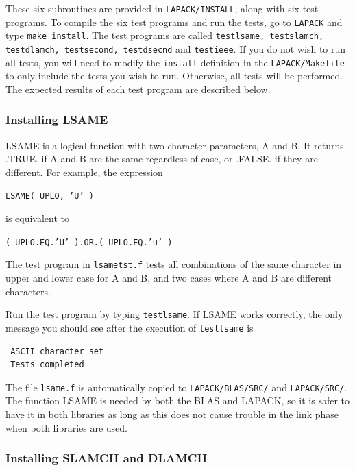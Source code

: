 \documentclass[11pt]{report}
\begin{document}
These six subroutines are provided in \texttt{LAPACK/INSTALL},
along with six test programs.
To compile the six test programs and run the tests, go to \texttt{LAPACK} and
type \texttt{make install}.  The test programs are called
\texttt{testlsame, testslamch, testdlamch, testsecond, testdsecnd} and
\texttt{testieee}.
If you do not wish to run all tests, you will need to modify the 
\texttt{install} definition in the \texttt{LAPACK/Makefile} to only include the
tests you wish to run.  Otherwise, all tests will be performed.
The expected results of each test program are described below.

\subsubsection{Installing LSAME}

LSAME is a logical function with two character parameters, A and B.
It returns .TRUE. if A and B are the same regardless of case, or .FALSE.
if they are different. 
For example, the expression

\begin{list}{}{} 
\item \texttt{LSAME( UPLO, 'U' )}
\end{list}
\noindent 
is equivalent to
\begin{list}{}{} 
\item \texttt{( UPLO.EQ.'U' ).OR.( UPLO.EQ.'u' )}
\end{list} 
 
The test program in \texttt{lsametst.f} tests all combinations of
the same character in upper and lower case for A and B, and two
cases where A and B are different characters.

Run the test program by typing \texttt{testlsame}.
If LSAME works correctly, the only message you should see after the
execution of \texttt{testlsame} is
\begin{verbatim}
 ASCII character set
 Tests completed
\end{verbatim}
The file \texttt{lsame.f} is automatically copied to
\texttt{LAPACK/BLAS/SRC/} and \texttt{LAPACK/SRC/}. 
The function LSAME is needed by both the BLAS and LAPACK, so it is safer
to have it in both libraries as long as this does not cause trouble
in the link phase when both libraries are used.

\subsubsection{Installing SLAMCH and DLAMCH}
\end{document}
